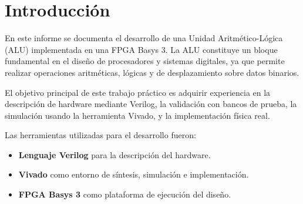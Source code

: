 \section{Introducción}

En este informe se documenta el desarrollo de una Unidad Aritmético-Lógica (ALU) implementada en una FPGA Basys 3.  
La ALU constituye un bloque fundamental en el diseño de procesadores y sistemas digitales, ya que permite realizar operaciones aritméticas, lógicas y de desplazamiento sobre datos binarios.  

El objetivo principal de este trabajo práctico es adquirir experiencia en la descripción de hardware mediante Verilog, la validación con bancos de prueba, la simulación usando la herramienta Vivado, y la implementación física real.  

Las herramientas utilizadas para el desarrollo fueron:  
\begin{itemize}
    \item \textbf{Lenguaje Verilog} para la descripción del hardware.
    \item \textbf{Vivado} como entorno de síntesis, simulación e implementación.
    \item \textbf{FPGA Basys 3} como plataforma de ejecución del diseño.
\end{itemize}
